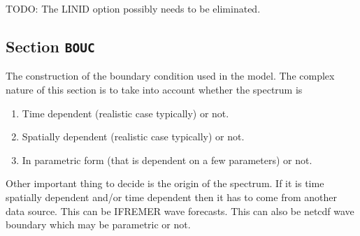 \documentclass[12pt]{amsart}
\begin{document}
TODO: The LINID option possibly needs to be eliminated.



\newpage

\subsection{Section {\tt BOUC}}
The construction of the boundary condition used in the model. The complex nature of this section is to take into account whether the spectrum is
\begin{enumerate}
\item Time dependent (realistic case typically) or not.
\item Spatially dependent (realistic case typically) or not.
\item In parametric form (that is dependent on a few parameters) or not.
\end{enumerate}
Other important thing to decide is the origin of the spectrum. If it is time spatially dependent and/or time dependent then it has to come from another data source. This can be IFREMER wave forecasts. This can also be netcdf wave boundary which may be parametric or not.
\end{document}
